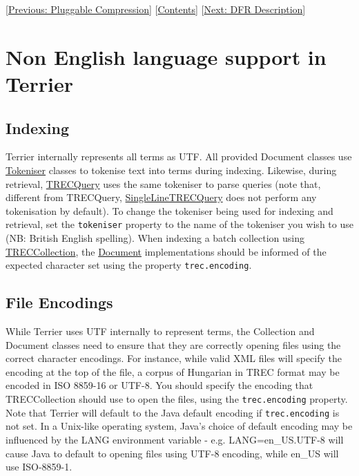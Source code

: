{[}\href{compression.html}{Previous: Pluggable Compression}{]}
{[}\href{index.html}{Contents}{]} {[}\href{dfr_description.html}{Next:
DFR Description}{]}\\

\section{Non English language support in
Terrier}\label{non-english-language-support-in-terrier}

\subsection{Indexing}\label{indexing}

Terrier internally represents all terms as UTF. All provided Document
classes use
\href{javadoc/org/terrier/indexing/tokenisation/Tokeniser.html}{Tokeniser}
classes to tokenise text into terms during indexing. Likewise, during
retrieval,
\href{javadoc/org/terrier/structures/TRECQuery.html}{TRECQuery} uses the
same tokeniser to parse queries (note that, different from TRECQuery,
\href{javadoc/org/terrier/structures/SingleLineTRECQuery.html}{SingleLineTRECQuery}
does not perform any tokenisation by default). To change the tokeniser
being used for indexing and retrieval, set the \texttt{tokeniser}
property to the name of the tokeniser you wish to use (NB: British
English spelling). When indexing a batch collection using
\href{javadoc/org/terrier/indexing/TRECCollection.html}{TRECCollection},
the \href{javadoc/org/terrier/indexing/Document.html}{Document}
implementations should be informed of the expected character set using
the property \texttt{trec.encoding}.

\subsection{File Encodings}\label{file-encodings}

While Terrier uses UTF internally to represent terms, the Collection and
Document classes need to ensure that they are correctly opening files
using the correct character encodings. For instance, while valid XML
files will specify the encoding at the top of the file, a corpus of
Hungarian in TREC format may be encoded in ISO 8859-16 or UTF-8. You
should specify the encoding that TRECCollection should use to open the
files, using the \texttt{trec.encoding} property. Note that Terrier will
default to the Java default encoding if \texttt{trec.encoding} is not
set. In a Unix-like operating system, Java's choice of default encoding
may be influenced by the LANG environment variable - e.g.
LANG=en\_US.UTF-8 will cause Java to default to opening files using
UTF-8 encoding, while en\_US will use ISO-8859-1.

